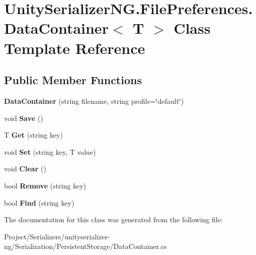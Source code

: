 \hypertarget{class_unity_serializer_n_g_1_1_file_preferences_1_1_data_container}{}\section{Unity\+Serializer\+N\+G.\+File\+Preferences.\+Data\+Container$<$ T $>$ Class Template Reference}
\label{class_unity_serializer_n_g_1_1_file_preferences_1_1_data_container}
\subsection*{Public Member Functions}
\begin{DoxyCompactItemize}
\item 
\mbox{\label{class_unity_serializer_n_g_1_1_file_preferences_1_1_data_container_a4b1f0577fa6ca4c776f3686345c60b54}} 
{\bfseries Data\+Container} (string filename, string profile=\char`\"{}default\char`\"{})
\item 
\mbox{\label{class_unity_serializer_n_g_1_1_file_preferences_1_1_data_container_afe011b5fda126cda070a579b7ddaf757}} 
void {\bfseries Save} ()
\item 
\mbox{\label{class_unity_serializer_n_g_1_1_file_preferences_1_1_data_container_abfbe4c458404a00ea26ff5016052b0cb}} 
T {\bfseries Get} (string key)
\item 
\mbox{\label{class_unity_serializer_n_g_1_1_file_preferences_1_1_data_container_a429dcbda1023683c5dc8165b656b0207}} 
void {\bfseries Set} (string key, T value)
\item 
\mbox{\label{class_unity_serializer_n_g_1_1_file_preferences_1_1_data_container_a35be729a4fa39d872f62d6023c643421}} 
void {\bfseries Clear} ()
\item 
\mbox{\label{class_unity_serializer_n_g_1_1_file_preferences_1_1_data_container_a66e36bd3263585e4436774a54556de89}} 
bool {\bfseries Remove} (string key)
\item 
\mbox{\label{class_unity_serializer_n_g_1_1_file_preferences_1_1_data_container_af6486648b0ee1a9aa968f45c4fbf1e68}} 
bool {\bfseries Find} (string key)
\end{DoxyCompactItemize}


The documentation for this class was generated from the following file\+:\begin{DoxyCompactItemize}
\item 
Project/\+Serializers/unityserializer-\/ng/\+Serialization/\+Persistent\+Storage/Data\+Container.\+cs\end{DoxyCompactItemize}
